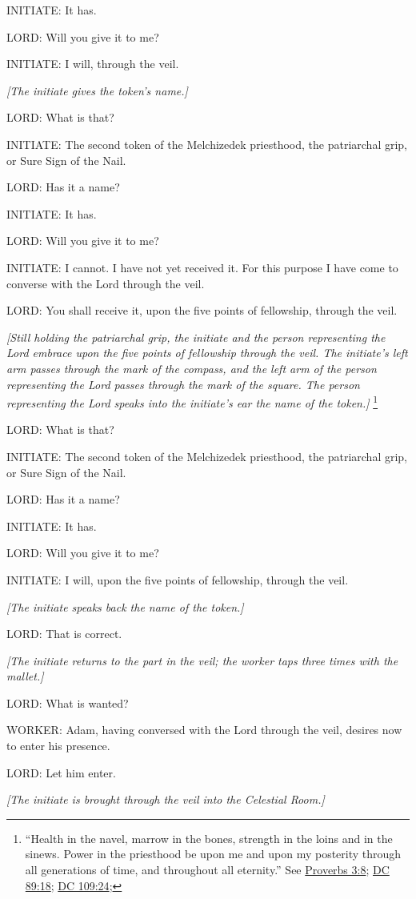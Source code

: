 				INITIATE: It has.

				LORD: Will you give it to me?

				INITIATE: I will, through the veil.

				\textit{[The initiate gives the token's name.]}

				LORD: What is that?

				INITIATE: The second token of the Melchizedek priesthood, the patriarchal grip, or Sure Sign of the Nail.

				LORD: Has it a name?

				INITIATE: It has.

				LORD: Will you give it to me?

				INITIATE: I cannot. I have not yet received it. For this purpose I have come to converse with the Lord through the veil.

				LORD: You shall receive it, upon the five points of fellowship, through the veil.

				\textit{[Still holding the patriarchal grip, the initiate and the person representing the Lord embrace upon the five points of fellowship through the veil. The initiate's left arm passes through the mark of the compass, and the left arm of the person representing the Lord passes through the mark of the square. The person representing the Lord speaks into the initiate's ear the name of the token.]}%
					\footnote{%
						``Health in the navel, marrow in the bones, strength in the loins and in the sinews. Power in the priesthood be upon me and upon my posterity through all generations of time, and throughout all eternity.'' See \hyperref[PROVERBS-3-8]{Proverbs 3:8}; \hyperref[DC89-18]{DC 89:18}; \hyperref[DC109-24]{DC 109:24}; 
						}

				LORD: What is that?

				INITIATE: The second token of the Melchizedek priesthood, the patriarchal grip, or Sure Sign of the Nail.

				LORD: Has it a name?

				INITIATE: It has.

				LORD: Will you give it to me?

				INITIATE: I will, upon the five points of fellowship, through the veil.

				\textit{[The initiate speaks back the name of the token.]}

				LORD: That is correct.

				\textit{[The initiate returns to the part in the veil; the worker taps three times with the mallet.]}

				LORD: What is wanted?

				WORKER: Adam, having conversed with the Lord through the veil, desires now to enter his presence.

				LORD: Let him enter.

				\textit{[The initiate is brought through the veil into the Celestial Room.]}